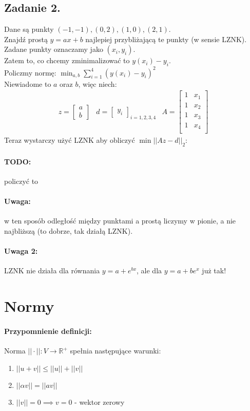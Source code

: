 \documentclass{article}
\begin{document}
\subsection{Zadanie 2.}
Dane są punkty $(-1, -1), (0,2), (1, 0), (2, 1)$.\\
Znajdź prostą $ y=ax+b $ najlepiej przybliżającą te punkty (w sensie LZNK).\\
Zadane punkty oznaczamy jako $ (x_i, y_i) $.\\
Zatem to, co chcemy zminimalizować to $y(x_i)-y_i$.\\
Policzmy normę: $ \min_{a, b} \sum_{i=1}^{4}(y(x_i)-y_i)^2$\\
Niewiadome to $ a $ oraz $ b $, więc niech:
$$
\begin{matrix}
	z=\begin{bmatrix}a\\b\end{bmatrix}&
	d=\begin{bmatrix}y_i\end{bmatrix}_{i=1, 2, 3, 4}&
	A=\begin{bmatrix}
		1&x_1\\
		1&x_2\\
		1&x_3\\
		1&x_4\\
	\end{bmatrix}
\end{matrix}
$$
Teraz wystarczy użyć LZNK aby obliczyć $\min{||Az-d||_2}$:
\paragraph{TODO:} policzyć to
\paragraph{Uwaga:} w ten sposób odległość między punktami a prostą liczymy w pionie, a nie najbliższą (to dobrze, tak działą LZNK).
\paragraph{Uwaga 2:} LZNK nie działa dla równania $ y=a+e^{bx} $, ale dla $ y=a+be^x $ już tak!
\section{Normy}
\paragraph{Przypomnienie definicji: } Norma $ ||\cdot||: V\rightarrow\mathbb{R}^+$ spełnia następujące warunki:
\begin{enumerate}
	\item $||u+v||\leq||u||+||v||$
	\item $||\alpha v||=||av||$
	\item $||v||=0\implies v=0$ - wektor zerowy
\end{enumerate}
\end{document}
